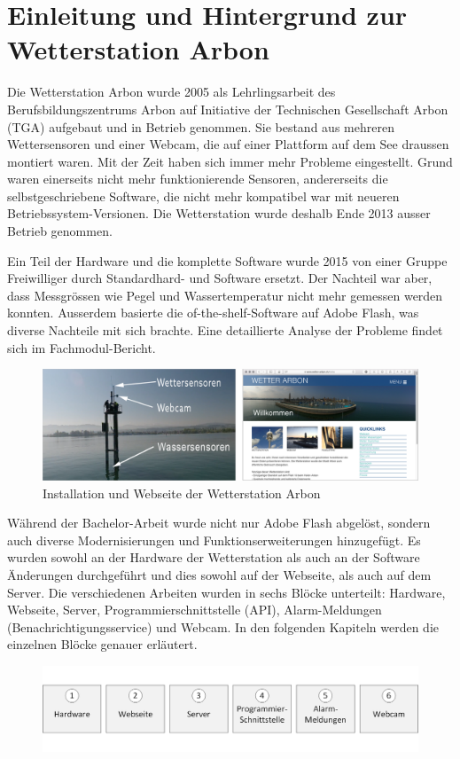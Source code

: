 \section*{Einleitung und Hintergrund zur Wetterstation Arbon}

Die Wetterstation Arbon wurde 2005 als Lehrlingsarbeit des Berufsbildungszentrums Arbon auf Initiative der Technischen Gesellschaft Arbon (TGA) aufgebaut und in Betrieb genommen. Sie bestand aus mehreren Wettersensoren und einer Webcam, die auf einer Plattform auf dem See draussen montiert waren. Mit der Zeit haben sich immer mehr Probleme eingestellt. Grund waren einerseits nicht mehr funktionierende Sensoren, andererseits die selbstgeschriebene Software, die nicht mehr kompatibel war mit neueren Betriebssystem-Versionen. Die Wetterstation wurde deshalb Ende 2013 ausser Betrieb genommen.

Ein Teil der Hardware und die komplette Software wurde 2015 von einer Gruppe Freiwilliger durch Standardhard- und Software ersetzt. Der Nachteil war aber, dass Messgrössen wie Pegel und Wassertemperatur nicht mehr gemessen werden konnten. Ausserdem basierte die of-the-shelf-Software auf Adobe Flash, was diverse Nachteile mit sich brachte. Eine detaillierte Analyse der Probleme findet sich im Fachmodul-Bericht\cite{BilWie2018MUIu}.

\begin{figure}[htbp!]
	\centering
	\includegraphics[width=1\linewidth]{img/kombi}
	\caption{Installation und Webseite der Wetterstation Arbon}
	\label{img:wetterstation}
\end{figure}

\noindent
Während der Bachelor-Arbeit wurde nicht nur Adobe Flash abgelöst, sondern auch diverse Modernisierungen und Funktionserweiterungen hinzugefügt. Es wurden sowohl an der Hardware der Wetterstation als auch an der Software Änderungen durchgeführt und dies sowohl auf der Webseite, als auch auf dem Server. Die verschiedenen Arbeiten wurden in sechs Blöcke unterteilt: Hardware, Webseite, Server, Programmierschnittstelle (API), Alarm-Meldungen (Benachrichtigungsservice) und Webcam. In den folgenden Kapiteln werden die einzelnen Blöcke genauer erläutert.

\begin{figure}[htbp]
	\centering
	\includegraphics[width=\textwidth]{img/module}
	\label{img:module}
\end{figure}
\newpage
